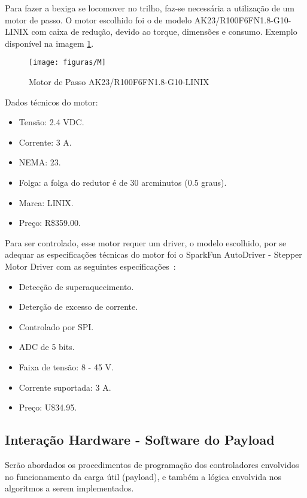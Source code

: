 Para fazer a bexiga se locomover no trilho, faz-se necessária a utilização de um motor de passo. O motor escolhido foi o de modelo AK23/R100F6FN1.8-G10-LINIX com caixa de redução, devido ao torque, dimensões e consumo. Exemplo disponível na imagem \ref{img:motorpasso}.

\begin{figure}[H]
  \centering
  \caption[Motor de Passo AK23/R100F6FN1.8-G10-LINIX]{Motor de Passo AK23/R100F6FN1.8-G10-LINIX~\cite{robocore}}
  \label{img:motorpasso}
  \texttt{[image: figuras/M]}
\end{figure}

Dados técnicos do motor:

\begin{itemize}
	\item Tensão: 2.4 VDC.
	\item Corrente: 3 A.
	\item NEMA: 23.
	\item Folga: a folga do redutor é de 30 arcminutos (0.5 graus).
	\item Marca: LINIX.
	\item Preço: R\$359.00.
\end{itemize}

Para ser controlado, esse motor requer um driver, o modelo escolhido, por se adequar as especificações técnicas do motor foi o SparkFun AutoDriver - Stepper Motor Driver com as seguintes especificações~\cite{pololu}:

\begin{itemize}
	\item Detecção de superaquecimento.
	\item Deterção de excesso de corrente.
	\item Controlado por SPI.
	\item ADC de 5 bits.
	\item Faixa de tensão: 8 - 45 V.
	\item Corrente suportada: 3 A.
	\item Preço: U\$34.95.
\end{itemize}

\subsection{Interação Hardware - Software do Payload}
\label{sec:interacao_hard}

	Serão abordados os procedimentos de programação dos controladores envolvidos no funcionamento da carga útil (payload), e também a lógica envolvida nos algoritmos a serem implementados.

